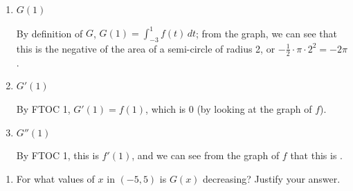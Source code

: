 \documentclass{article}
\begin{document}
\begin{enumerate}
{\begin{enumerate}
\begin{enumerate}
      \item
        \begin{problem}[\vfill]
          $G(1)$
        \end{problem}

        \begin{solution}
          By definition of $G$, $\displaystyle G(1) = \int_{-3}^1
          f(t)\,dt$; from the graph, we can see that this is the negative
          of the area of a semi-circle of radius 2, or $- \frac{1}{2}
          \cdot \pi \cdot 2^2 = \boxed{-2\pi}$.
        \end{solution}

      \item
        \begin{problem}[\vfill]
          $G'(1)$ 
        \end{problem}

        \begin{solution}
          By FTOC 1, $G'(1) = f(1)$, which is $\boxed{0}$ (by looking at
          the graph of $f$).
        \end{solution}

      \item
        \begin{problem}[\vfill\newpage]
          $G''(1)$
        \end{problem}

        \begin{solution}
          By FTOC 1, this is $f'(1)$, and we can see from the graph of $f$
          that this is .
        \end{solution}

      \end{enumerate}

    \end{enumerate}


    \begin{enumerate}[resume]

    \item
      \begin{problem}[\vfill]
        For what values of $x$ in $(-5, 5)$ is $G(x)$ decreasing?  Justify
        your answer.
      \end{problem}


\end{enumerate}}
\end{enumerate}
\end{document}
